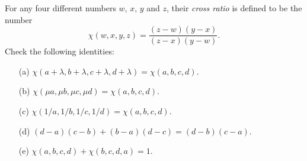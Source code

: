 \documentclass[a4paper]{book}
\newcommand{\PURPLE}[1]{{\color{purple}#1}}
\newcommand{\lm}        {\lambda}
\renewcommand{\:}{\colon}
\newcommand{\mathworld}[1]{}
\newcommand{\DEFN}[1]{\PURPLE{\emph{#1}}}
\theoremstyle{definition}
\newenvironment{starex}{
 \renewcommand{\thetheorem}{\arabic{chapter}.\arabic{section}.\arabic{theorem}${}^*$}
 \exercise
}{\endexercise}
\begin{document}
\begin{starex}
 For any four different numbers $w$, $x$, $y$ and $z$, their
 \DEFN{cross ratio} \mathworld{Cross-Ratio} is defined to be 
 the number  
 \[ \chi(w,x,y,z) = \frac{(z-w)(y-x)}{(z-x)(y-w)}. \]
 Check the following identities:
 \begin{itemize}
  \item[(a)] $\chi(a+\lm,b+\lm,c+\lm,d+\lm)=\chi(a,b,c,d)$.
  \item[(b)] $\chi(\mu a,\mu b,\mu c,\mu d)=\chi(a,b,c,d)$.
  \item[(c)] $\chi(1/a,1/b,1/c,1/d)=\chi(a,b,c,d)$.
  \item[(d)] $(d-a)(c-b)+(b-a)(d-c)=(d-b)(c-a)$.
  \item[(e)] $\chi(a,b,c,d)+\chi(b,c,d,a)=1$. 
 \end{itemize}
\end{starex}
\end{document}
